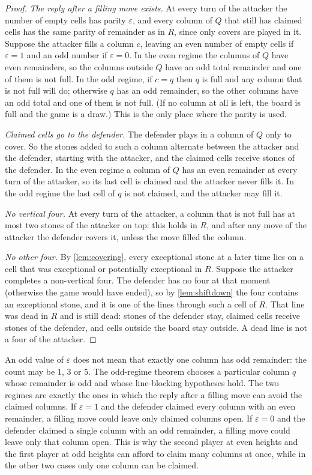 \documentclass[11pt,a4paper]{article}
\theoremstyle{plain}
\theoremstyle{definition}
\newcommand{\eps}{\varepsilon}
\begin{document}
\begin{proof}
\emph{The reply after a filling move exists.} At every turn of the attacker the number of empty cells has parity $\eps$, and every column of $Q$ that still has claimed cells has the same parity of remainder as in $R$, since only covers are played in it. Suppose the attacker fills a column $c$, leaving an even number of empty cells if $\eps=1$ and an odd number if $\eps=0$. In the even regime the columns of $Q$ have even remainders, so the columns outside $Q$ have an odd total remainder and one of them is not full. In the odd regime, if $c=q$ then $q$ is full and any column that is not full will do; otherwise $q$ has an odd remainder, so the other columns have an odd total and one of them is not full. (If no column at all is left, the board is full and the game is a draw.) This is the only place where the parity is used.

\emph{Claimed cells go to the defender.} The defender plays in a column of $Q$ only to cover. So the stones added to such a column alternate between the attacker and the defender, starting with the attacker, and the claimed cells receive stones of the defender. In the even regime a column of $Q$ has an even remainder at every turn of the attacker, so its last cell is claimed and the attacker never fills it. In the odd regime the last cell of $q$ is not claimed, and the attacker may fill it.

\emph{No vertical four.} At every turn of the attacker, a column that is not full has at most two stones of the attacker on top: this holds in $R$, and after any move of the attacker the defender covers it, unless the move filled the column.

\emph{No other four.} By \cref{lem:covering}, every exceptional stone at a later time lies on a cell that was exceptional or potentially exceptional in $R$. Suppose the attacker completes a non-vertical four. The defender has no four at that moment (otherwise the game would have ended), so by \cref{lem:shiftdown} the four contains an exceptional stone, and it is one of the lines through such a cell of $R$. That line was dead in $R$ and is still dead: stones of the defender stay, claimed cells receive stones of the defender, and cells outside the board stay outside. A dead line is not a four of the attacker.
\end{proof}

An odd value of $\eps$ does not mean that exactly one column has odd remainder: the count may be $1$, $3$ or $5$. The odd-regime theorem chooses a particular column $q$ whose remainder is odd and whose line-blocking hypotheses hold. The two regimes are exactly the ones in which the reply after a filling move can avoid the claimed columns. If $\eps=1$ and the defender claimed every column with an even remainder, a filling move could leave only claimed columns open. If $\eps=0$ and the defender claimed a single column with an odd remainder, a filling move could leave only that column open. This is why the second player at even heights and the first player at odd heights can afford to claim many columns at once, while in the other two cases only one column can be claimed.
\end{document}
